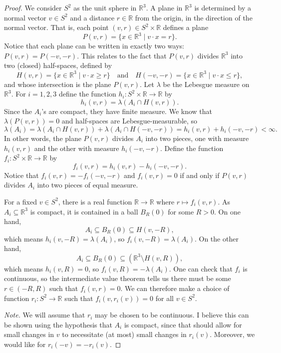 \documentclass[12pt]{article}
\theoremstyle{definition}
\newcommand{\isp}[1]{\quad\text{#1}\quad}
\newcommand{\R}{\mathbb{R}}
\newcommand{\<}{\langle}
\renewcommand{\>}{\rangle}
\newcommand{\seq}{\subseteq}
\begin{document}
\begin{proof}
    We consider $S^2$ as the unit sphere in $\R^3$.
    A plane in $\R^3$ is determined by a normal vector $v \in S^2$ and a distance $r \in \R$ from the origin, in the direction of the normal vector.
    That is, each point $(v, r) \in S^2 \times \R$ defines a plane
    \[
        P(v, r) = \{x \in \R^3 \mid v \cdot x = r\}.
    \]
    Notice that each plane can be written in exactly two ways: $P(v, r) = P(-v, -r)$.
    This relates to the fact that $P(v, r)$ divides $\R^3$ into two (closed) half-spaces, defined by
    \[
        H(v, r) = \{x \in \R^3 \mid v \cdot x \geq r\}
        \isp{and}
        H(-v, -r) = \{x \in \R^3 \mid v \cdot x \leq r\},
    \]
    and whose intersection is the plane $P(v, r)$.
    Let $\lambda$ be the Lebesgue measure on $\R^3$.
    For $i = 1, 2, 3$ define the function $h_i : S^2 \times \R \to \R$ by
    \[
        h_i(v, r) = \lambda(A_i \cap H(v, r)).
    \]
    Since the $A_i$'s are compact, they have finite measure.
    We know that $\lambda(P(v, r)) = 0$ and half-spaces are Lebesgue-measurable, so
    \[
        \lambda(A_i)
            = \lambda(A_i \cap H(v, r)) + \lambda(A_i \cap H(-v, -r))
            = h_i(v, r) + h_i(-v, -r) < \infty.
    \]
    In other words, the plane $P(v, r)$ divides $A_i$ into two pieces, one with measure $h_i(v, r)$ and the other with measure $h_i(-v, -r)$.
    Define the function $f_i : S^2 \times \R \to \R$ by
    \[
        f_i(v, r) = h_i(v, r) - h_i(-v, -r).
    \]
    Notice that $f_i(v, r) = -f_i(-v, -r)$ and $f_i(v, r) = 0$ if and only if $P(v, r)$ divides $A_i$ into two pieces of equal measure.

    For a fixed $v \in S^2$, there is a real function $\R \to \R$ where $r \mapsto f_i(v, r)$.
    As $A_i \seq \R^3$ is compact, it is contained in a ball $B_R(0)$ for some $R > 0$.
    On one hand,
    \[
        A_i \seq B_R(0) \seq H(v, -R),
    \]
    which means $h_i(v, -R) = \lambda(A_i)$, so $f_i(v, -R) = \lambda(A_i)$.
    On the other hand,
    \[
        A_i \seq B_R(0) \seq (\R^3 \setminus H(v, R)),
    \]
    which means $h_i(v, R) = 0$, so $f_i(v, R) = -\lambda(A_i)$.
    One can check that $f_i$ is continuous, so the intermediate value theorem tells us there must be some $r \in (-R, R)$ such that $f_i(v, r) = 0$.
    We can therefore make a choice of function $r_i : S^2 \to \R$ such that $f_i(v, r_i(v)) = 0$ for all $v \in S^2$.
    
    \textit{Note.} We will assume that $r_i$ may be chosen to be continuous.
    I believe this can be shown using the hypothesis that $A_i$ is compact, since that should allow for small changes in $v$ to necessitate (at most) small changes in $r_i(v)$.
    Moreover, we would like for $r_i(-v) = -r_i(v)$.


\end{proof}
\end{document}

